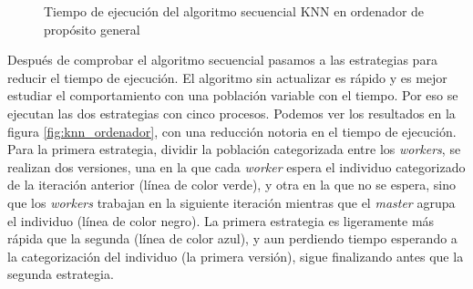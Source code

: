 \begin{figure}[!h]
	\centering
	\caption{Tiempo de ejecución del algoritmo secuencial KNN en ordenador de propósito general}
	\label{fig:knn_secuencial}
\end{figure}



Después de comprobar el algoritmo secuencial pasamos a las estrategias para reducir el tiempo de ejecución. El algoritmo sin actualizar es rápido y es mejor estudiar el comportamiento con una población variable con el tiempo. Por eso se ejecutan las dos estrategias con cinco procesos. Podemos ver los resultados en la figura \ref{fig:knn_ordenador}, con una reducción notoria en el tiempo de ejecución. Para la primera estrategia, dividir la población categorizada entre los \textit{workers}, se realizan dos versiones, una en la que cada \textit{worker} espera el individuo categorizado de la iteración anterior (línea de color verde), y otra en la que no se espera, sino que los \textit{workers} trabajan en la siguiente iteración mientras que el \textit{master} agrupa el individuo (línea de color negro). La primera estrategia es ligeramente más rápida que la segunda (línea de color azul), y aun perdiendo tiempo esperando a la categorización del individuo (la primera versión), sigue finalizando antes que la segunda estrategia. 

